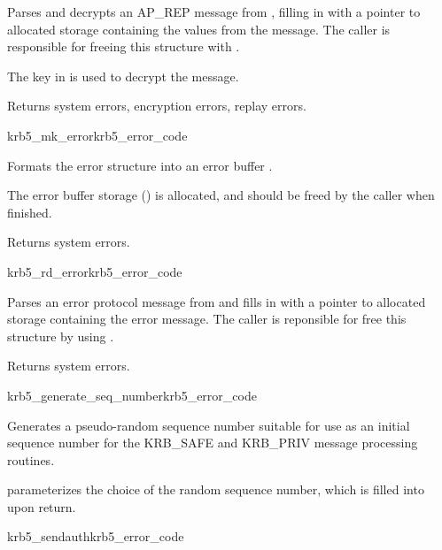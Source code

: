 Parses and decrypts an AP_REP message from , filling in
 with a pointer to  allocated storage containing the
values from the message.  The caller is responsible for freeing this
structure with .

The key in  is used to decrypt the message.

Returns system errors, encryption errors, replay errors.

\begin{funcdecl}{krb5_mk_error}{krb5_error_code}{\funcin}
\funcout
{}
\end{funcdecl}

Formats the error structure  into an error buffer
.

The error buffer storage () is
allocated, and should be freed by the caller when finished.

Returns system errors.

\begin{funcdecl}{krb5_rd_error}{krb5_error_code}{\funcin}
\funcout
{}
\end{funcdecl}

Parses an error protocol message from  and fills in 
 with a pointer to allocated storage containing
the error message.  The caller is reponsible for free this structure by
using .

Returns system errors.

\begin{funcdecl}{krb5_generate_seq_number}{krb5_error_code}{\funcin}
\funcout
{}
\end{funcdecl}

Generates a pseudo-random sequence number suitable for use as an initial
sequence number for the KRB_SAFE and KRB_PRIV message processing
routines.

 parameterizes the choice of the random sequence number,
which is filled into  upon return.

\begin{funcdecl}{krb5_sendauth}{krb5_error_code}
\funcin
{}
\funcinout
{}
\funcout
{}
\end{funcdecl}

